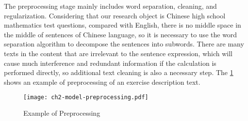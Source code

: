 

The preprocessing stage mainly includes word separation, cleaning, and regularization. Considering that our research object is Chinese high school mathematics test questions, compared with English, there is no middle space in the middle of sentences of Chinese language, so it is necessary to use the word separation algorithm to decompose the sentences into subwords. There are many texts in the content that are irrelevant to the sentence expression, which will cause much interference and redundant information if the calculation is performed directly, so additional text cleaning is also a necessary step. The \figurename{\ref{fig:ch2-model-preprocessing}} shows an example of preprocessing of an exercise description text.

\begin{figure}[htbp!]
	\centering
	\texttt{[image: ch2-model-preprocessing.pdf]}
	\caption{Example of Preprocessing}\label{fig:ch2-model-preprocessing}
\end{figure}


